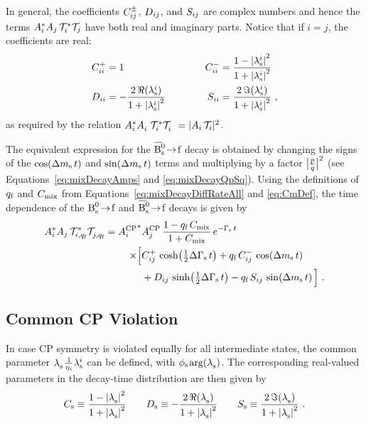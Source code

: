In general, the coefficients $\Cf[ij]^\pm$, $\Df[ij]$, and $\Sf[ij]$ are complex numbers and hence the terms
$\Ai^*\Ai[j]\,\timeAmp^*\timeAmp[j]$ have both real and imaginary parts. Notice that if $i=j$, the coefficients are real:
\begin{equation}
  \begin{alignedat}{2}
    \Cf[ii]^+ &= 1                                                    &  \Cf[ii]^- &= \frac{1-\lamsiSq}{1+\lamsiSq} \\
    \Df[ii]   &= -\frac{2\,\Re(\lamsi)}{1+\lamsiSq} \qquad\qquad  &  \Sf[ii]   &= \frac{2\,\Im(\lamsi)}{1+\lamsiSq} \ ,
  \end{alignedat}
\end{equation}
as required by the relation $\Ai^*\Ai^{\phantom{*}}\,\timeAmp^*\timeAmp^{\phantom{*}} = |\Ai\,\timeAmp|^2$.

The equivalent expression for the $\Bsbartof$ decay is obtained by changing the signs of the $\cDms$ and $\sDms$ terms and multiplying
by a factor $\pqAbsAlt^\text{2}$ (see Equations~\ref{eq:mixDecayAmps} and \ref{eq:mixDecayQpSq}). Using the definitions of $\qf$ and
$\Cm$ from Equations~\ref{eq:mixDecayDiffRateAll} and \ref{eq:CmDef}, the time dependence of the $\Bstof$ and $\Bsbartof$ decays is
given by
\begin{equation}
  \label{eq:timeqfDep}
  \begin{aligned}
    \Ai^*\Ai[j]\,\timeAmp[i,\qf]^*\timeAmp[j,\qf]^{\phantom{*}} =
      \AAvConj&\AAv[{\Ai[j]}]\, \frac{1-\qf\,\Cm}{1+\Cm}\, \eGst \\
          \times\Big[ &\Cf[ij]^+\,\cDGs + \qf\,\Cf[ij]^-\,\cDms \\
                      &+ \Df[ij]\,\sDGs - \qf\,\Sf[ij]\,\sDms \Big] \ .
  \end{aligned}
\end{equation}


\subsection{Common CP Violation}
\label{subsec:pheno_time_commonCPV}

In case CP symmetry is violated equally for all intermediate states, the common parameter $\lamsi[]$\textequiv$\frac{1}{\eta_i}\lamsi$ can
be defined, with $\phis$\texteq\tm$\arg(\lamsi[])$. The corresponding real-valued parameters in the decay-time distribution are then given
by
\begin{equation}
  \label{eq:CDSCommon}
         \Cs \equiv  \frac{1-\lamsiSq[]}{1+\lamsiSq[]}
  \qquad \Ds \equiv -\frac{2\,\Re(\lamsi[])}{1+\lamsiSq[]}
  \qquad \Ss \equiv  \frac{2\,\Im(\lamsi[])}{1+\lamsiSq[]}
  \ .
\end{equation}

